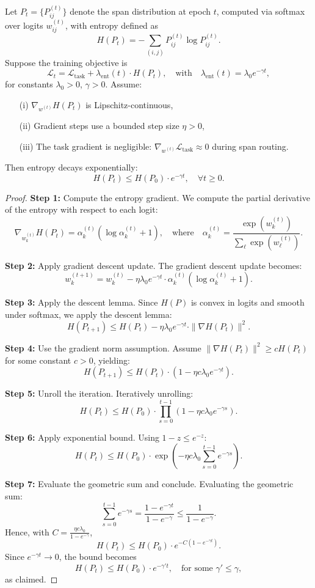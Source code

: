 \begin{proposition}
\label{prop:entropy_decay}
Let \( P_t = \{P_{ij}^{(t)}\} \) denote the span distribution at epoch \(t\), computed via softmax over logits \(w_{ij}^{(t)}\), with entropy defined as
\[
H(P_t) = -\sum_{(i,j)} P_{ij}^{(t)} \log P_{ij}^{(t)}.
\]
Suppose the training objective is
\[
\mathcal{L}_t = \mathcal{L}_{\text{task}} + \lambda_{\mathrm{ent}}(t) \cdot H(P_t), \quad \text{with} \quad \lambda_{\mathrm{ent}}(t) = \lambda_0 e^{-\gamma t},
\]
for constants \(\lambda_0 > 0\), \(\gamma > 0\). Assume:
\begin{itemize}
    \item[(i)] \(\nabla_{w^{(t)}} H(P_t)\) is Lipschitz-continuous,
    \item[(ii)] Gradient steps use a bounded step size \(\eta > 0\),
    \item[(iii)] The task gradient is negligible: \(\nabla_{w^{(t)}} \mathcal{L}_{\text{task}} \approx 0\) during span routing.
\end{itemize}
Then entropy decays exponentially:
\[
H(P_t) \leq H(P_0) \cdot e^{-\gamma t}, \quad \forall t \geq 0.
\]
\end{proposition}

\begin{proof}
\textbf{Step 1:} Compute the entropy gradient.
We compute the partial derivative of the entropy with respect to each logit:
\[
\nabla_{w_k^{(t)}} H(P_t) = \alpha_k^{(t)} \left( \log \alpha_k^{(t)} + 1 \right), \quad \text{where} \quad \alpha_k^{(t)} = \frac{\exp(w_k^{(t)})}{\sum_\ell \exp(w_\ell^{(t)})}.
\]

\textbf{Step 2:} Apply gradient descent update.
The gradient descent update becomes:
\[
w_k^{(t+1)} = w_k^{(t)} - \eta \lambda_0 e^{-\gamma t} \cdot \alpha_k^{(t)} (\log \alpha_k^{(t)} + 1).
\]

\textbf{Step 3:} Apply the descent lemma.
Since \(H(P)\) is convex in logits and smooth under softmax, we apply the descent lemma:
\[
H(P_{t+1}) \leq H(P_t) - \eta \lambda_0 e^{-\gamma t} \cdot \| \nabla H(P_t) \|^2.
\]

\textbf{Step 4:} Use the gradient norm assumption.
Assume \(\| \nabla H(P_t) \|^2 \geq c H(P_t)\) for some constant \(c > 0\), yielding:
\[
H(P_{t+1}) \leq H(P_t) \cdot (1 - \eta c \lambda_0 e^{-\gamma t}).
\]

\textbf{Step 5:} Unroll the iteration.
Iteratively unrolling:
\[
H(P_t) \leq H(P_0) \cdot \prod_{s=0}^{t-1} (1 - \eta c \lambda_0 e^{-\gamma s}).
\]

\textbf{Step 6:} Apply exponential bound.
Using \(1 - z \leq e^{-z}\):
\[
H(P_t) \leq H(P_0) \cdot \exp\left(-\eta c \lambda_0 \sum_{s=0}^{t-1} e^{-\gamma s} \right).
\]

\textbf{Step 7:} Evaluate the geometric sum and conclude.
Evaluating the geometric sum:
\[
\sum_{s=0}^{t-1} e^{-\gamma s} = \frac{1 - e^{-\gamma t}}{1 - e^{-\gamma}} \leq \frac{1}{1 - e^{-\gamma}}.
\]
Hence, with \(C = \frac{\eta c \lambda_0}{1 - e^{-\gamma}}\),
\[
H(P_t) \leq H(P_0) \cdot e^{-C (1 - e^{-\gamma t})}.
\]
Since \(e^{-\gamma t} \to 0\), the bound becomes
\[
H(P_t) \leq H(P_0) \cdot e^{-\gamma' t}, \quad \text{for some } \gamma' \leq \gamma,
\]
as claimed.
\end{proof}
